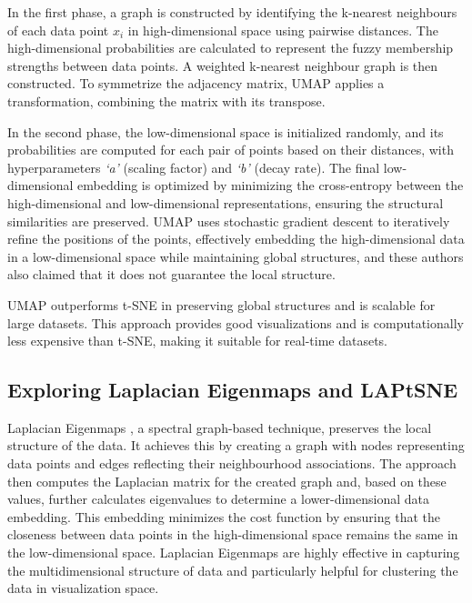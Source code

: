 In the first phase, a graph is constructed by identifying the k-nearest neighbours of each data point $x_i$ in high-dimensional space using pairwise distances. The high-dimensional probabilities are calculated to represent the fuzzy membership strengths between data points. A weighted k-nearest neighbour graph is then constructed. To symmetrize the adjacency matrix, UMAP applies a transformation, combining the matrix with its transpose.


In the second phase, the low-dimensional space is initialized randomly, and its probabilities are computed for each pair of points based on their distances, with hyperparameters \textit{`a'} (scaling factor) and \textit{`b'} (decay rate). The final low-dimensional embedding is optimized by minimizing the cross-entropy between the high-dimensional and low-dimensional representations, ensuring the structural similarities are preserved. UMAP \cite{umap_reference} uses stochastic gradient descent to iteratively refine the positions of the points, effectively embedding the high-dimensional data in a low-dimensional space while maintaining global structures, and these authors also claimed that it does not guarantee the local structure.


UMAP \cite{umap_reference} outperforms t-SNE \cite{tsne} in preserving global structures and is scalable for large datasets. This approach provides good visualizations and is computationally less expensive than t-SNE, making it suitable for real-time datasets.


\subsection{Exploring Laplacian Eigenmaps and LAPtSNE}

Laplacian Eigenmaps \cite{belkin2001laplacian}, a spectral graph-based technique, preserves the local structure of the data. It achieves this by creating a graph with nodes representing data points and edges reflecting their neighbourhood associations. The approach then computes the Laplacian matrix for the created graph and, based on these values, further calculates eigenvalues to determine a lower-dimensional data embedding. This embedding minimizes the cost function by ensuring that the closeness between data points in the high-dimensional space remains the same in the low-dimensional space. Laplacian Eigenmaps are highly effective in capturing the multidimensional structure of data and particularly helpful for clustering the data in visualization space. 

